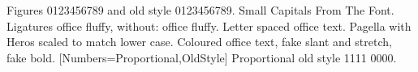 \documentclass{article}
\begin{document}
Figures 0123456789 and {\oldstyle old style 0123456789}.
{\smallcaps Small Capitals From The Font.}
Ligatures office fluffy, {\noligs without: office fluffy}.
{\spaced Letter spaced office text.}
Pagella with {\scaled Heros scaled to match} lower case.
{ Coloured office text}, {\fake fake slant and stretch}, {\bolder fake bold}.
[Numbers={Proportional,OldStyle}]
Proportional old style 1111 0000.
\end{document}
